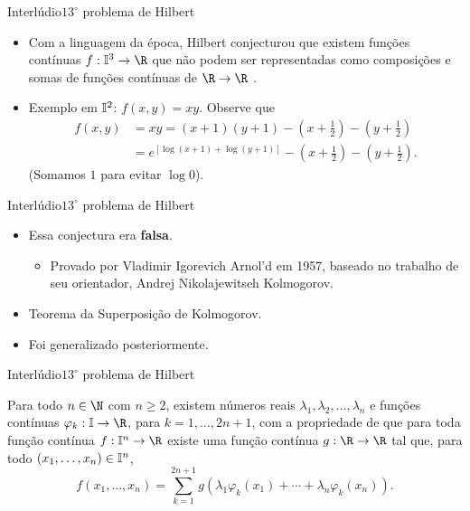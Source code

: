\documentclass[13pt]{beamer}
\begin{document}
\begin{frame}{Interlúdio}{\( 13^{ \circ } \) problema de Hilbert}
    \begin{itemize}
        \item Com a linguagem da época, Hilbert conjecturou que existem funções contínuas \( f : \I^{ 3 } \to \R \) que não podem ser representadas como composições e somas de funções contínuas de \( \R \to \R \) \cite{hilbert}.
        \item Exemplo em \( \mathbb{I}^{ 2 } \): \( f ( x, y ) = xy \). Observe que
            \begin{align*}
                f ( x, y) &= xy = ( x+1 ) ( y+1 ) - \left(x + \frac{ 1 }{ 2 }\right) - \left(y + \frac{ 1 }{ 2 }\right) \\
                          &= e^{ [ \log ( x + 1 ) + \log ( y+1 ) ] } - \left(x + \frac{ 1 }{ 2 }\right) - \left(y + \frac{ 1 }{ 2 }\right)
            .\end{align*}
            (Somamos \( 1 \) para evitar \( \log 0 \)).
    \end{itemize}
\end{frame}

\begin{frame}{Interlúdio}{\( 13^{ \circ } \) problema de Hilbert}
    \begin{itemize}
        \item<1-> Essa conjectura era \textbf{falsa}.
            \begin{itemize}
                \item<2-> Provado por Vladimir Igorevich Arnol'd em 1957, baseado no trabalho de seu orientador, Andrej Nikolajewitseh Kolmogorov.
            \end{itemize}
        \item<3-> Teorema da Superposição de Kolmogorov.
        \item<4-> Foi generalizado posteriormente.
    \end{itemize}
\end{frame}

\begin{frame}{Interlúdio}{\( 13^{ \circ } \) problema de Hilbert}
    \begin{teo*}
        Para todo \( n \in \N \) com \( n \geq 2 \), existem números reais \( \lambda_{ 1 }, \lambda_{ 2 }, \dots, \lambda_{ n } \) e funções contínuas \( \varphi_{ k } : \I \to \R \), para \( k = 1, \dots, 2n+1 \), com a propriedade de que para toda função contínua \( f : \I^{ n } \to \R \) existe uma função contínua \( g : \R \to \R \) tal que, para todo \( ( x_{ 1 }, \dots, x_{ n } ) \in \mathbb{I}^{ n } \),
        \begin{equation*}
            f ( x_{ 1 }, \dots, x_{ n } ) = \sum_{ k=1 }^{ 2n+1 } g ( \lambda_{ 1 } \varphi_{ k } ( x_{ 1 } ) + \cdots + \lambda_{ n } \varphi_{ k } ( x_{ n } ) )
        .\end{equation*}
    \end{teo*}
\end{frame}
\end{document}
